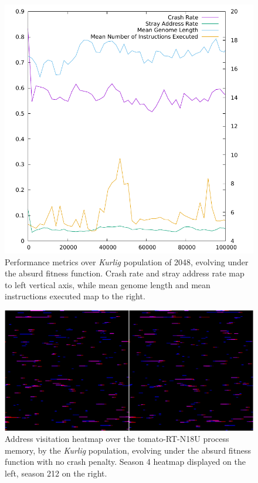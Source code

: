 \documentclass[12pt,glossary]{dalthesis}
\begin{document}
\begin{figure}[htbp]
\centering
\includegraphics[width=.9\linewidth]{../images/plots/kurlig_kafka_performance.pdf}
\caption{\label{fig:org495762d}
Performance metrics over \emph{Kurlig} population of 2048, evolving under the absurd fitness function. Crash rate and stray address rate map to left vertical axis, while mean genome length and mean instructions executed map to the right.}
\end{figure}

\begin{figure}[htbp]
\centering
\includegraphics[width=.9\linewidth]{../images/plots/kurlig_heatmap_4_212_montage.pdf}
\caption{\label{fig:org5ad6f15}
Address visitation heatmap over the tomato-RT-N18U process memory, by the \emph{Kurlig} population, evolving under the absurd fitness function with no crash penalty. Season 4 heatmap displayed on the left, season 212 on the right.}
\end{figure}
\end{document}
